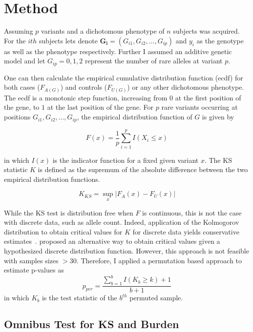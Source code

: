 \section{Method}
\label{sec:method}

Assuming $p$ variants and a dichotomous phenotype of $n$ subjects was acquired.
For the $ith$ subjects lets denote $\pmb{G_i} = (G_{i1}, G_{i2},\ldots , G_{ip})$ and $y_i$ as the genotype as well as the phenotype respectively.
Further I assumed an additive genetic model and let $G_{ip} = 0, 1, 2$ represent the number of rare alleles at variant $p$.  

One can then calculate the empirical cumulative distribution function (ecdf) for both cases ($F_{A(G)}$) and controls ($F_{U(G)}$) or any other dichotomous phenotype.
The ecdf is a monotonic step function, increasing from $0$ at the first position of the gene, to $1$ at the last position of the gene.
For $p$ rare variants occurring at positions  $G_{i1}, G_{i2}, \ldots, G_{ip}$, the empirical distribution function of $G$ is given by

\begin{equation}
  F(x) = \frac{1}{p}\sum^p_{i=1}I(X_i \leq x)
\end{equation}

in which $I(x)$ is the indicator function for a fixed given variant $x$.
The KS statistic $K$ is defined as the supremum of the absolute difference between the two empirical distribution functions.

\begin{equation}
	K_{KS} = \sup_x | F_A(x) - F_U(x) |
\end{equation}

While the KS test is distribution free when $F$ is continuous, this is not the case with discrete data, such as allele count.
Indeed, application of the Kolmogorov distribution to obtain critical values for $K$ for discrete data yields conservative estimates~\cite{Walsh1963,Conover1972}. 
\citet{Conover1972} proposed an alternative way to obtain critical values given a hypothesized discrete distribution function.
However, this approach is not feasible with samples sizes $>30$.
Therefore, I applied a permutation based approach to estimate p-values as 
\begin{equation}
  p_{per} = \frac{\sum^b_{b=1} I(K_b \geq k)+1}{b+1}
\end{equation}
in which $K_b$ is the test statistic of the $b^{th}$ permuted sample.

\subsection{Omnibus Test for KS and Burden}
\label{sub:omnibus_test_for_ks_and_burden}

